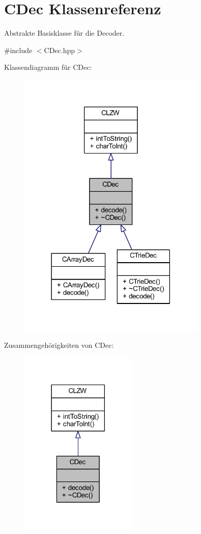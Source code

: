 \hypertarget{class_c_dec}{}\section{C\+Dec Klassenreferenz}
\label{class_c_dec}


Abstrakte Basisklasse für die Decoder.  




{\ttfamily \#include $<$C\+Dec.\+hpp$>$}



Klassendiagramm für C\+Dec\+:
\nopagebreak
\begin{figure}[H]
\begin{center}
\leavevmode
\includegraphics[width=254pt]{class_c_dec__inherit__graph}
\end{center}
\end{figure}


Zusammengehörigkeiten von C\+Dec\+:
\nopagebreak
\begin{figure}[H]
\begin{center}
\leavevmode
\includegraphics[width=158pt]{class_c_dec__coll__graph}
\end{center}
\end{figure}
